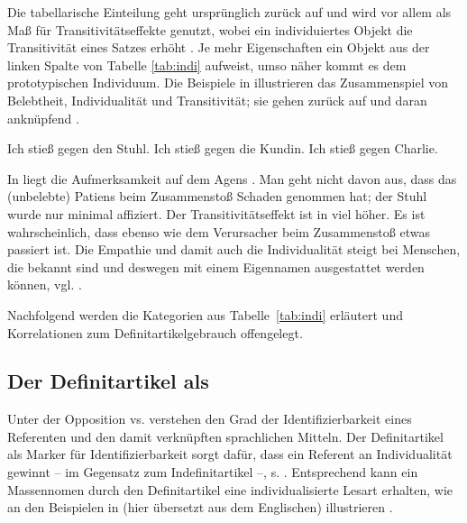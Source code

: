 Die tabellarische Einteilung geht ursprünglich zurück auf \textcite{Timberlake1975,Timberlake1977} und wird vor allem als Maß für Transitivitätseffekte genutzt, wobei ein individuiertes Objekt die Transitivität eines Satzes erhöht \parencite[s. auch][]{Gillmann2016}. Je mehr Eigenschaften ein Objekt aus der linken Spalte von Tabelle \ref{tab:indi} aufweist, umso näher kommt es dem prototypischen Individuum. 
Die Beispiele in  illustrieren das Zusammenspiel von Belebtheit, Individualität und Transitivität; sie gehen zurück auf \textcite[253]{Hopper1980} und daran anknüpfend \textcite[344]{Szczepaniak2011}.

\begin{exe}
	\ex \label{ex:stossen}
	\begin{xlist}
		\ex \label{ex:stuhl} Ich stieß gegen den Stuhl.
 		\ex \label{ex:kundin} Ich stieß gegen die Kundin.
		\ex \label{ex:chalie} Ich stieß gegen Charlie.
	\end{xlist}
\end{exe}
\noindent
In  liegt die Aufmerksamkeit auf dem Agens . Man geht nicht davon aus, dass das (unbelebte) Patiens  beim  Zusammenstoß Schaden genommen hat; der Stuhl wurde nur minimal affiziert. Der Transitivitätseffekt ist in  viel höher. Es ist wahrscheinlich, dass  ebenso wie dem Verursacher beim Zusammenstoß etwas passiert ist. Die Empathie und damit auch die Individualität steigt bei Menschen, die bekannt sind und deswegen mit einem Eigennamen ausgestattet werden können, vgl. .

Nachfolgend werden die Kategorien aus Tabelle~\ref{tab:indi} erläutert und Korrelationen zum Definitartikelgebrauch offengelegt. 

\subsection{Der Definitartikel als } \label{sec:individualisierer} 

Unter der Opposition  vs.  verstehen \textcite{Hopper1980} den Grad der Identifizierbarkeit eines Referenten und den damit verknüpften sprachlichen Mitteln. Der Definitartikel als Marker für Identifizierbarkeit sorgt dafür, dass ein Referent an Individualität gewinnt -- im Gegensatz zum Indefinitartikel --, s. . Entsprechend kann ein Massennomen durch den Definitartikel eine individualisierte Lesart erhalten, wie \textcite[253]{Hopper1980} an den Beispielen in  (hier übersetzt aus dem Englischen) illustrieren \parencite[vgl. auch][257]{Leiss2000}.

